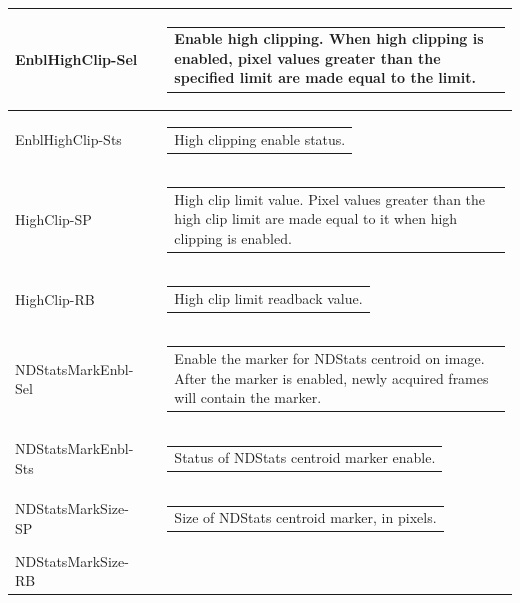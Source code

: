 \documentclass[openany]{article}
\begin{document}
\begin{longtable}{| m{3.0cm} m{4.5cm} m{7.0cm} |}
        EnblHighClip-Sel &  & \begin{tabular}{@{}m{6cm}@{}}
                Enable high clipping. When high clipping is enabled,
                pixel values greater than the specified limit are made equal to the
                limit.
            \end{tabular} \\ \hline
        EnblHighClip-Sts &  & \begin{tabular}{@{}m{6cm}@{}}
                High clipping enable status.
            \end{tabular} \hypertarget{pv:high-clip}{}\\ \hline
        HighClip-SP &  & \begin{tabular}{@{}m{6cm}@{}}
                High clip limit value. Pixel values greater than the high clip
                limit are made equal to it when high clipping is enabled.
            \end{tabular} \\ \hline
        HighClip-RB &  & \begin{tabular}{@{}m{6cm}@{}}
                High clip limit readback value.
            \end{tabular} \hypertarget{pv:ndstats-mark-enbl}{}\\ \hline
        NDStatsMarkEnbl-Sel &  & \begin{tabular}{@{}m{6cm}@{}}
                Enable the marker for NDStats centroid on image. After the marker
                is enabled, newly acquired frames will contain the marker.
            \end{tabular} \hypertarget{}{}\\ \hline
        NDStatsMarkEnbl-Sts &  & \begin{tabular}{@{}m{6cm}@{}}
                Status of NDStats centroid marker enable.
            \end{tabular} \hypertarget{pv:ndstats-mark-size}{}\\ \hline
        NDStatsMarkSize-SP &  & \begin{tabular}{@{}m{6cm}@{}}
                Size of NDStats centroid marker, in pixels.
            \end{tabular} \hypertarget{}{}\\ \hline
        NDStatsMarkSize-RB &  & \begin{tabular}{@{}m{6cm}@{}}

\end{tabular}
\end{longtable}
\end{document}
